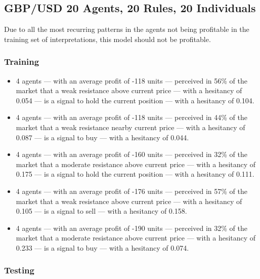 \subsection{GBP/USD 20 Agents, 20 Rules, 20 Individuals}
\label{}

Due to all the most recurring patterns in the agents not being profitable in the training set of interpretations, this model should not be profitable.

\subsubsection{Training}
\label{}

{\small
  \begin{itemize}
  \item 4 agents — with an average profit of -118 units — perceived in 56\% of
    the market that a weak resistance above current price — with a hesitancy of
    0.054 — is a signal to hold the current position — with a hesitancy of
    0.104.
  \item 4 agents — with an average profit of -118 units — perceived in 44\% of
    the market that a weak resistance nearby current price — with a hesitancy of
    0.087 — is a signal to buy — with a hesitancy of 0.044.
  \item 4 agents — with an average profit of -160 units — perceived in 32\% of
    the market that a moderate resistance above current price — with a hesitancy
    of 0.175 — is a signal to hold the current position — with a hesitancy of
    0.111.
  \item 4 agents — with an average profit of -176 units — perceived in 57\% of
    the market that a weak resistance above current price — with a hesitancy of
    0.105 — is a signal to sell — with a hesitancy of 0.158.
  \item 4 agents — with an average profit of -190 units — perceived in 32\% of
    the market that a moderate resistance above current price — with a hesitancy
    of 0.233 — is a signal to buy — with a hesitancy of 0.074.
  \end{itemize}
}

\subsubsection{Testing}
\label{}

